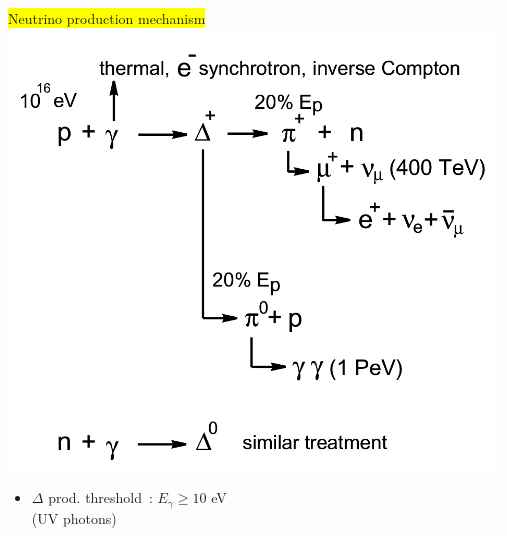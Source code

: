 \twocolumn
\begin{center}
\colorbox{yellow}{Neutrino production mechanism}\\
\includegraphics[keepaspectratio,width=13cm]{grb-engine2}
\end{center}
%
\begin{itemize}
\item $\Delta$ prod. threshold~: $E_{\gamma} \ge 10$ eV\\
      (UV photons)
\end{itemize}

